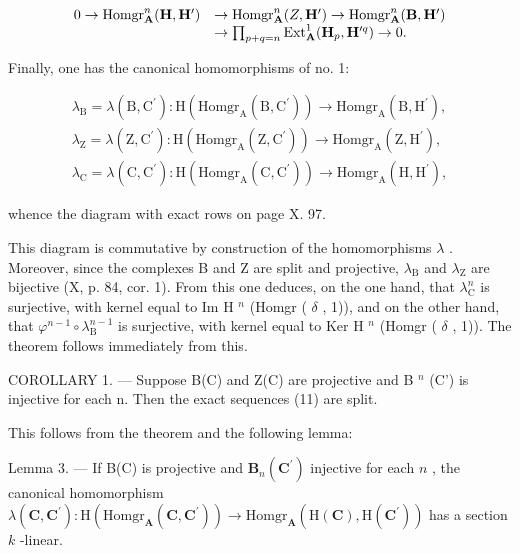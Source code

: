 \[
\begin{array}{r l} 0 \to \operatorname{Homgr} _ {\mathbf {A}} ^ {n} (\mathbf {H}, \mathbf {H} ^ {\prime}) & \to \operatorname{Homgr} _ {\mathbf {A}} ^ {n} (Z, \mathbf {H} ^ {\prime}) \to \operatorname{Homgr} _ {\mathbf {A}} ^ {n} (\mathbf {B}, \mathbf {H} ^ {\prime}) \\ & \to \prod_ {p + q = n} \operatorname{Ext} _ {\mathbf {A}} ^ {1} (\mathbf {H} _ {p}, \mathbf {H} ^ {\prime q}) \to 0. \end{array}
\]

Finally, one has the canonical homomorphisms of no. 1:

\[
\begin{array}{l} \lambda_ {\mathrm{B}} = \lambda (\mathrm{B}, \mathrm{C} ^ {\prime}): \mathrm{H} (\mathrm{Homgr} _ {\mathrm{A}} (\mathrm{B}, \mathrm{C} ^ {\prime})) \to \mathrm{Homgr} _ {\mathrm{A}} (\mathrm{B}, \mathrm{H} ^ {\prime}), \\ \lambda_ {\mathrm{Z}} = \lambda (\mathrm{Z}, \mathrm{C} ^ {\prime}): \mathrm{H} (\mathrm{Homgr} _ {\mathrm{A}} (\mathrm{Z}, \mathrm{C} ^ {\prime})) \to \mathrm{Homgr} _ {\mathrm{A}} (\mathrm{Z}, \mathrm{H} ^ {\prime}), \\ \lambda_ {\mathrm{C}} = \lambda (\mathrm{C}, \mathrm{C} ^ {\prime}): \mathrm{H} (\mathrm{Homgr} _ {\mathrm{A}} (\mathrm{C}, \mathrm{C} ^ {\prime})) \to \mathrm{Homgr} _ {\mathrm{A}} (\mathrm{H}, \mathrm{H} ^ {\prime}), \end{array}
\]

whence the diagram with exact rows on page X. 97.

This diagram is commutative by construction of the homomorphisms \(\lambda\) . Moreover, since the complexes B and Z are split and projective, \(\lambda_{\mathrm{B}}\) and \(\lambda_{\mathrm{Z}}\) are bijective (X, p. 84, cor. 1). From this one deduces, on the one hand, that \(\lambda_{\mathrm{C}}^{n}\) is surjective, with kernel equal to Im H \(^{n}\) (Homgr ( \(\delta\) , 1)), and on the other hand, that \(\varphi^{n-1} \circ \lambda_{\mathrm{B}}^{n-1}\) is surjective, with kernel equal to Ker H \(^{n}\) (Homgr ( \(\delta\) , 1)). The theorem follows immediately from this.

COROLLARY 1. --- Suppose B(C) and Z(C) are projective and B \(^{n}\) (C') is injective for each n. Then the exact sequences (11) are split.

This follows from the theorem and the following lemma:

Lemma 3. --- If B(C) is projective and \(\mathbf{B}_{n}(\mathbf{C}^{\prime})\) injective for each \(n\) , the canonical homomorphism \(\lambda(\mathbf{C}, \mathbf{C}^{\prime}): \mathrm{H}(\mathrm{Homgr}_{\mathbf{A}}(\mathbf{C}, \mathbf{C}^{\prime})) \to \mathrm{Homgr}_{\mathbf{A}}(\mathrm{H}(\mathbf{C}), \mathrm{H}(\mathbf{C}^{\prime}))\) has a section \(k\) -linear.

